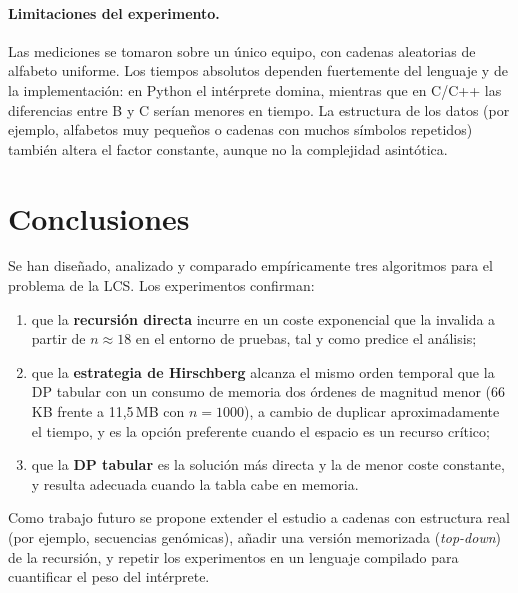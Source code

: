 \documentclass[11pt,a4paper]{article}
\begin{document}
\paragraph{Limitaciones del experimento.}
Las mediciones se tomaron sobre un único equipo, con cadenas aleatorias
de alfabeto uniforme. Los tiempos absolutos dependen fuertemente del
lenguaje y de la implementación: en Python el intérprete domina,
mientras que en C/C++ las diferencias entre B y C serían menores en
tiempo. La estructura de los datos (por ejemplo, alfabetos muy pequeños
o cadenas con muchos símbolos repetidos) también altera el factor
constante, aunque no la complejidad asintótica.

\section{Conclusiones}\label{sec:conclusiones}

Se han diseñado, analizado y comparado empíricamente tres algoritmos
para el problema de la LCS. Los experimentos confirman:

\begin{enumerate}
    \item que la \textbf{recursión directa} incurre en un coste
          exponencial que la invalida a partir de $n\approx 18$ en el
          entorno de pruebas, tal y como predice el análisis;
    \item que la \textbf{estrategia de Hirschberg} alcanza el mismo
          orden temporal que la DP tabular con un consumo de memoria dos
          órdenes de magnitud menor (66\,KB frente a 11,5\,MB con
          $n=1000$), a cambio de duplicar aproximadamente el tiempo, y es
          la opción preferente cuando el espacio es un recurso crítico;
    \item que la \textbf{DP tabular} es la solución más directa y la de
          menor coste constante, y resulta adecuada cuando la tabla cabe
          en memoria.
\end{enumerate}

Como trabajo futuro se propone extender el estudio a cadenas con
estructura real (por ejemplo, secuencias genómicas), añadir una versión
memorizada (\emph{top-down}) de la recursión, y repetir los
experimentos en un lenguaje compilado para cuantificar el peso del
intérprete.
\end{document}

